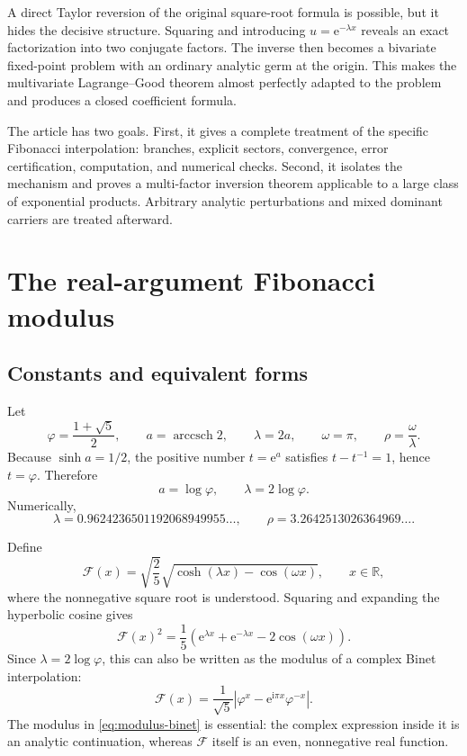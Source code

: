 \documentclass[11pt,oneside]{article}
\numberwithin{equation}{section}
\theoremstyle{plain}
\theoremstyle{definition}
\theoremstyle{remark}
\newcommand{\Fcal}{\mathcal{F}}
\newcommand{\e}{\mathrm e}
\newcommand{\ii}{\mathrm i}
\newcommand{\R}{\mathbb R}
\DeclareMathOperator{\arccsch}{arccsch}
\begin{document}
A direct Taylor reversion of the original square-root formula is possible,
but it hides the decisive structure.  Squaring and introducing
\(u=\e^{-\lambda x}\) reveals an exact factorization into two conjugate
factors.  The inverse then becomes a bivariate fixed-point problem with an
ordinary analytic germ at the origin.  This makes the multivariate
Lagrange--Good theorem almost perfectly adapted to the problem and produces
a closed coefficient formula.

The article has two goals.  First, it gives a complete treatment of the
specific Fibonacci interpolation: branches, explicit sectors, convergence,
error certification, computation, and numerical checks.  Second, it isolates
the mechanism and proves a multi-factor inversion theorem applicable to a
large class of exponential products.  Arbitrary analytic perturbations and
mixed dominant carriers are treated afterward.

\section{The real-argument Fibonacci modulus}

\subsection{Constants and equivalent forms}

Let
\begin{equation}\label{eq:phi-lambda-rho}
 \varphi=\frac{1+\sqrt5}{2},\qquad
 a=\arccsch 2,\qquad
 \lambda=2a,
 \qquad \omega=\pi,
 \qquad \rho=\frac{\omega}{\lambda}.
\end{equation}
Because \(\sinh a=1/2\), the positive number \(t=\e^a\) satisfies
\(t-t^{-1}=1\), hence \(t=\varphi\).  Therefore
\begin{equation}\label{eq:arccsch-phi}
 a=\log\varphi,
 \qquad
 \lambda=2\log\varphi.
\end{equation}
Numerically,
\[
 \lambda=0.9624236501192068949955\ldots,
 \qquad
 \rho=3.2642513026364969\ldots.
\]

Define
\begin{equation}\label{eq:F-definition}
 \Fcal(x)=\sqrt{\frac25}
 \sqrt{\cosh(\lambda x)-\cos(\omega x)},
 \qquad x\in\R,
\end{equation}
where the nonnegative square root is understood.  Squaring and expanding the
hyperbolic cosine gives
\begin{equation}\label{eq:F-square-exp}
 \Fcal(x)^2
 =\frac15\left(\e^{\lambda x}+\e^{-\lambda x}
                   -2\cos(\omega x)\right).
\end{equation}
Since \(\lambda=2\log\varphi\), this can also be written as the modulus of a
complex Binet interpolation:
\begin{equation}\label{eq:modulus-binet}
 \Fcal(x)
 =\frac1{\sqrt5}\left|
    \varphi^x-\e^{\ii\pi x}\varphi^{-x}
  \right|.
\end{equation}
The modulus in \cref{eq:modulus-binet} is essential: the complex expression
inside it is an analytic continuation, whereas \(\Fcal\) itself is an even,
nonnegative real function.
\end{document}

